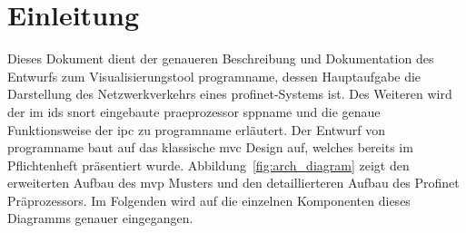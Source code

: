 \chapter{Einleitung}
Dieses Dokument dient der genaueren Beschreibung und Dokumentation des Entwurfs zum Visualisierungstool \gls{programname}, dessen Hauptaufgabe die Darstellung des Netzwerkverkehrs eines \gls{profinet}-Systems ist. Des Weiteren wird der im \gls{ids} \gls{snort} eingebaute \gls{praeprozessor} \gls{sppname} und die genaue Funktionsweise der \gls{ipc} zu \gls{programname} erläutert.\newline
 \newline
Der Entwurf von \gls{programname} baut auf das klassische \gls{mvc} Design auf, welches bereits im Pflichtenheft präsentiert wurde. Abbildung~\ref{fig:arch_diagram} zeigt den erweiterten Aufbau des \gls{mvp} Musters und den detaillierteren Aufbau des Profinet Präprozessors. Im Folgenden wird auf die einzelnen Komponenten dieses Diagramms genauer eingegangen.\newline

